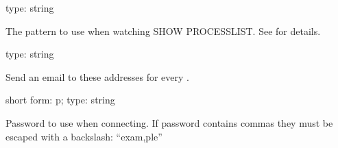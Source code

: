 \documentclass[letterpaper,10pt,english]{sphinxmanual}
\begin{document}
\begin{fulllineitems}
\label{\detokenize{mariadb-stat:cmdoption-mariadb-stat-match}}
type: string

The pattern to use when watching SHOW PROCESSLIST.  See {\hyperref[\detokenize{mariadb-stat:cmdoption-mariadb-stat-function}]{}}
for details.

\end{fulllineitems}


\begin{fulllineitems}
\label{\detokenize{mariadb-stat:cmdoption-mariadb-stat-notify-by-email}}
type: string

Send an email to these addresses for every {\hyperref[\detokenize{mariadb-stat:cmdoption-mariadb-stat-collect}]{}}.

\end{fulllineitems}


\begin{fulllineitems}
\label{\detokenize{mariadb-stat:cmdoption-mariadb-stat-password}}
short form: \sphinxhyphen{}p; type: string

Password to use when connecting.
If password contains commas they must be escaped with a backslash: “exam,ple”

\end{fulllineitems}
\end{document}
